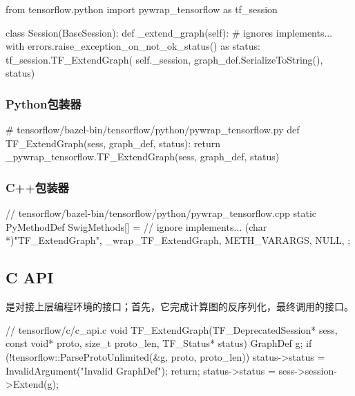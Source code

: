 \begin{content}
\begin{leftbar}
\begin{python}
from tensorflow.python import pywrap_tensorflow as tf_session

class Session(BaseSession):
  def _extend_graph(self):
    # ignores implements...
    with errors.raise_exception_on_not_ok_status() as status:
      tf_session.TF_ExtendGraph(
        self._session, graph_def.SerializeToString(), status)
\end{python}
\end{leftbar}

\subsubsection{Python包装器}

\begin{leftbar}
\begin{python}
# tensorflow/bazel-bin/tensorflow/python/pywrap\_tensorflow.py
def TF_ExtendGraph(sess, graph_def, status):
  return _pywrap_tensorflow.TF_ExtendGraph(sess, graph_def, status)
\end{python}
\end{leftbar}

\subsubsection{C++包装器}

\begin{leftbar}
\begin{c++}
// tensorflow/bazel-bin/tensorflow/python/pywrap\_tensorflow.cpp
static PyMethodDef SwigMethods[] = {
  // ignore implements...
  { (char *)"TF_ExtendGraph", _wrap_TF_ExtendGraph, METH_VARARGS, NULL},
};
\end{c++}
\end{leftbar}

\subsection{C API}

是对接上层编程环境的接口；首先，它完成计算图的反序列化，最终调用的接口。

\begin{leftbar}
\begin{c++}
// tensorflow/c/c\_api.c
void TF_ExtendGraph(TF_DeprecatedSession* sess, 
  const void* proto, size_t proto_len, TF_Status* status) {
  GraphDef g;
  if (!tensorflow::ParseProtoUnlimited(&g, proto, proto_len)) {
    status->status = InvalidArgument("Invalid GraphDef");
    return;
  }
  status->status = sess->session->Extend(g);
}
\end{c++}
\end{leftbar}


\end{content}
